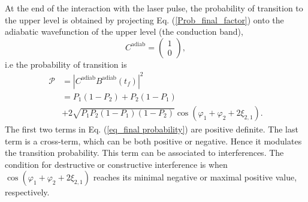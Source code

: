 \documentclass[9pt,twocolumn,twoside]{osajnl}
\begin{document}
At the end of the interaction with the laser pulse, the probability of transition to the upper level is obtained by projecting Eq. (\ref{Prob_final_factor}) onto the adiabatic wavefunction of the upper level (the conduction band),
\begin{equation}\label{Prob_high}
	C^{\mathrm{adiab}}=
	\begin{pmatrix}
		1 \\ 0
	\end{pmatrix},
\end{equation}
i.e the probability of transition is
\begin{align}\label{eq_final probability}
	\mathcal{P}
	                  &=|C^{\mathrm{adiab}} B^{\mathrm{adiab}}(t_f)|^2 \nonumber \\
			 &= 
			 P_1(1-P_{2}) + P_{2}(1-P_1) \nonumber \\
			 &+ 2\sqrt{P_1 P_{2}(1-P_1)(1-P_{2})}\cos(\varphi_1+\varphi_{2}+2\xi_{2,1}).
	\end{align}
The first two terms in Eq. (\ref{eq_final probability}) are positive definite. The  last term is a
cross-term, which can be both positive or negative. Hence it modulates the transition probability. This term can be associated to interferences. The condition for destructive or constructive interference is when $\cos(\varphi_1+\varphi_2+2\xi_{2,1})$ reaches its minimal negative or maximal positive value, respectively.
\end{document}
